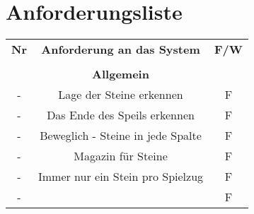 	\chapter*{Anforderungsliste}
	\begin{table}[hbt]
	\centering
	\label{Anforderungsliste}
	\begin{tabular}{ccc}
		\textbf{Nr} & \textbf{Anforderung an das System} & \textbf{F/W} \\
		\textbf{} & \textbf{}& \textbf{}  \\
		\hline
		\hline
		\textbf{} & \textbf{Allgemein}& \textbf{}  \\
		\hline
		\hline
		- & Lage der Steine erkennen & F\\
		\hline
		- & Das Ende des Speils erkennen & F\\
		\hline
		- & Beweglich - Steine in jede Spalte	& F\\
		\hline
		- &Magazin für Steine  & F\\
		\hline
		- & Immer nur ein Stein pro Spielzug & F\\
		\hline
		- &  & F\\
		\hline
		
	\end{tabular}
\end{table}